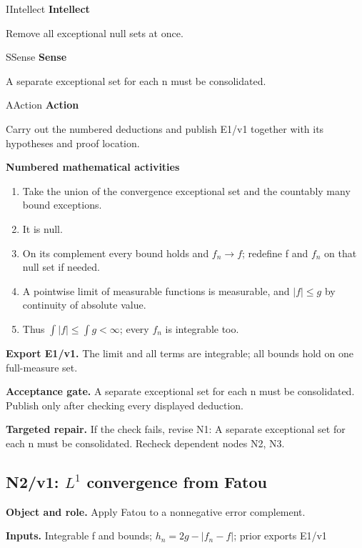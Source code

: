 \documentclass[preprint,12pt,aps,pra,showkeys,amsmath,amssymb,superscriptaddress,floatfix]{revtex4-2}
\theoremstyle{definition}
\theoremstyle{remark}
\newcommand{\mmfaculty}[3]{%
 \begin{mmfacultybox}{#1}{#2}
 {\sffamily\bfseries\color{MMBlue}#2}\par\smallskip #3
 \end{mmfacultybox}}
\newcommand{\field}[2]{\par\smallskip\noindent\textbf{#1.} #2\par}
\begin{document}
\mmfaculty{I}{Intellect}{Remove all exceptional null sets at once.}

\mmfaculty{S}{Sense}{A separate exceptional set for each n must be consolidated.}

\mmfaculty{A}{Action}{Carry out the numbered deductions and publish E1/v1 together with its
hypotheses and proof location.}

\smallskip\noindent\textbf{Numbered mathematical activities}

\begin{enumerate}[label=N1.\arabic*,leftmargin=3.4em]

\item Take the union of the convergence exceptional set and the countably many
bound exceptions.

\item It is null.

\item On its complement every bound holds and \(f_n\to f\); redefine f and
\(f_n\) on that null set if needed.

\item A pointwise limit of measurable functions is measurable, and
\(|f|\le g\) by continuity of absolute value.

\item Thus \(\int |f|\le \int g<\infty\); every \(f_n\) is integrable too.

\end{enumerate}

\field{Export E1/v1}{The limit and all terms are integrable; all bounds hold on one
full-measure set.}

\field{Acceptance gate}{A separate exceptional set for each n must be consolidated. Publish only
after checking every displayed deduction.}

\field{Targeted repair}{If the check fails, revise N1: A separate exceptional set for each n
must be consolidated. Recheck dependent nodes N2, N3.}

\clearpage

\subsection{N2/v1: \(L^{1}\) convergence from Fatou}

\field{Object and role}{Apply Fatou to a nonnegative error complement.}

\field{Inputs}{Integrable f and bounds; \(h_n=2g-|f_n-f|\); prior exports E1/v1}
\end{document}

